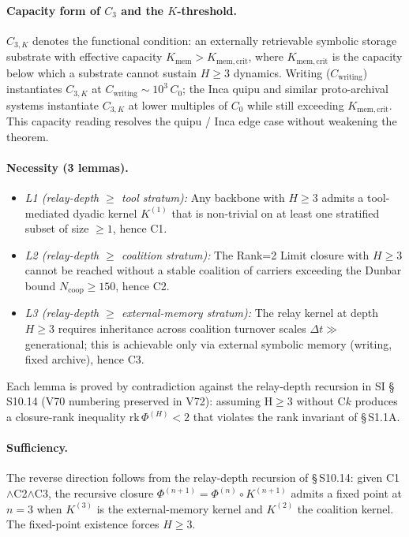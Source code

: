 \documentclass[11pt]{article}
\begin{document}
\paragraph{Capacity form of $C_3$ and the $K$-threshold.} $C_{3,K}$ denotes the functional condition: an externally retrievable symbolic storage substrate with effective capacity $K_{\mathrm{mem}}>K_{\mathrm{mem,crit}}$, where $K_{\mathrm{mem,crit}}$ is the capacity below which a substrate cannot sustain $H\!\ge\!3$ dynamics. Writing ($C_{\mathrm{writing}}$) instantiates $C_{3,K}$ at $C_{\mathrm{writing}}\sim 10^{3}\,C_{0}$; the Inca quipu and similar proto-archival systems instantiate $C_{3,K}$ at lower multiples of $C_0$ while still exceeding $K_{\mathrm{mem,crit}}$. This capacity reading resolves the quipu / Inca edge case without weakening the theorem.

\paragraph{Necessity (3 lemmas).}
\begin{itemize}\setlength\itemsep{0.1em}
  \item \emph{L1 (relay-depth $\geq$ tool stratum):} Any backbone with $H{\geq}3$ admits a tool-mediated dyadic kernel $K^{(1)}$ that is non-trivial on at least one stratified subset of size $\geq 1$, hence C1.
  \item \emph{L2 (relay-depth $\geq$ coalition stratum):} The Rank=2 Limit closure with $H{\geq}3$ cannot be reached without a stable coalition of carriers exceeding the Dunbar bound $N_{\mathrm{coop}}\!\geq\!150$, hence C2.
  \item \emph{L3 (relay-depth $\geq$ external-memory stratum):} The relay kernel at depth $H{\geq}3$ requires inheritance across coalition turnover scales $\Delta t \gg$ generational; this is achievable only via external symbolic memory (writing, fixed archive), hence C3.
\end{itemize}
Each lemma is proved by contradiction against the relay-depth recursion in SI \S\,S10.14 (V70 numbering preserved in V72): assuming H$\geq 3$ without C$k$ produces a closure-rank inequality $\mathrm{rk}\,\Phi^{(H)} < 2$ that violates the rank invariant of \S\,S1.1A.

\paragraph{Sufficiency.} The reverse direction follows from the relay-depth recursion of \S\,S10.14: given C1$\wedge$C2$\wedge$C3, the recursive closure $\Phi^{(n+1)}=\Phi^{(n)}\circ K^{(n+1)}$ admits a fixed point at $n{=}3$ when $K^{(3)}$ is the external-memory kernel and $K^{(2)}$ the coalition kernel. The fixed-point existence forces $H\geq 3$.
\end{document}
